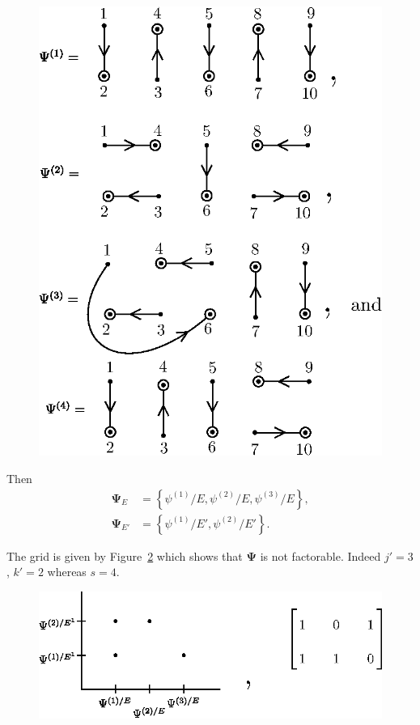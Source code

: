 \documentclass[a4paper,12pt]{article}
\theoremstyle{definition}
\theoremstyle{underlinethm}
\theoremstyle{definition}
\begin{document}
\begin{figure}[h]
\centering
\includegraphics[scale=1.1]{figure/figures/fig9.eps}
\caption{}\label{fig09}
\end{figure}

Then 
\begin{align*}
\boldsymbol{\Psi}_{E} &= \left\{\psi^{(1)}/E , \psi^{(2)}/E, \psi^{(3)}/E\right\},\\
\boldsymbol{\Psi}_{E'} & = \left\{\psi^{(1)}/E' , \psi^{(2)}/E'\right\}.
\end{align*}



The grid is given by Figure~\ref{fig10} which shows that $\boldsymbol{\Psi}$ is not factorable. Indeed $j' =3$, $k'=2$ whereas $s = 4$.

\newpage

\begin{figure}[h]
\centering
\includegraphics[scale=1.1]{figure/figures/fig10.eps}
\caption{}\label{fig10}
\end{figure}
\end{document}
